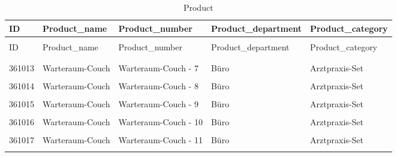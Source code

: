 \documentclass[letterpaper,12pt]{article}
\begin{document}
\begingroup
\renewcommand\arraystretch{0.5}
\begin{longtable}{p{1.4cm}p{2.7cm}p{3.7cm}p{3.4cm}p{3cm}}
        \caption{Product} \\
        ID & Product\_name & Product\_number & Product\_department & Product\_category \\
        \endfirsthead \\
        ID & Product\_name & Product\_number & Product\_department & Product\_category \\
        \endhead \\
        \hline \\
        361013 & Warteraum-Couch & Warteraum-Couch - 7 & Büro & Arztpraxis-Set \\
        \hline \\
        361014 & Warteraum-Couch & Warteraum-Couch - 8 & Büro & Arztpraxis-Set \\
        \hline \\
        361015 & Warteraum-Couch & Warteraum-Couch - 9 & Büro & Arztpraxis-Set \\
        \hline \\
        \color{red} 361016 & Warteraum-Couch & \color{red} Warteraum-Couch - 10 & Büro & Arztpraxis-Set \\
        \hline \\
        361017 & Warteraum-Couch & Warteraum-Couch - 11 & Büro & Arztpraxis-Set \\
        \hline \\
\end{longtable} 
\endgroup
\end{document}
